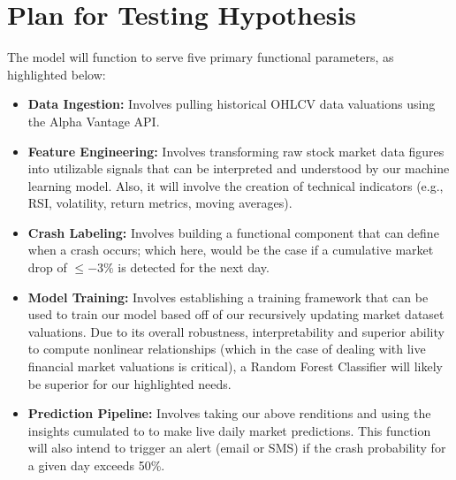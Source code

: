 \documentclass[runningheads]{llncs}
\begin{document}
\section*{Plan for Testing Hypothesis}
The model will function to serve five primary functional parameters, as highlighted below:

\begin{itemize}
  \item \textbf{Data Ingestion:} Involves pulling historical OHLCV data valuations using the Alpha Vantage API.

  \item \textbf{Feature Engineering:} Involves transforming raw stock market data figures into utilizable signals that can be interpreted and understood by our machine learning model. Also, it will involve the creation of technical indicators (e.g., RSI, volatility, return metrics, moving averages).

  \item \textbf{Crash Labeling:} Involves building a functional component that can define when a crash occurs; which here, would be the case if a cumulative market drop of \( \leq -3\% \) is detected for the next day.

  \item \textbf{Model Training:}  Involves establishing a training framework that can be used to train our model based off of our recursively updating market dataset valuations. Due to its overall robustness, interpretability and superior ability to compute nonlinear relationships (which in the case of dealing with live financial market valuations is critical), a Random Forest Classifier will likely be superior for our highlighted needs.


  \item \textbf{Prediction Pipeline:} Involves taking our above renditions and using the insights cumulated to to make live daily market predictions. This function will also intend to trigger an alert (email or SMS) if the crash probability for a given day exceeds 50\%.
\end{itemize}
\end{document}

